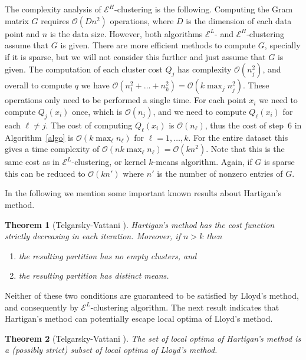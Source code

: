 \documentclass[aps,preprint,nofootinbib,floatfix]{revtex4-1}
\newtheorem{theorem}{Theorem}
\newcommand\OO{{\mathcal{O}}}
\begin{document}
The complexity analysis of $\mathcal{E}^H$-clustering is the following.
Computing the Gram matrix $G$ requires $\OO( D n^2)$ operations, where 
$D$ is the dimension of each data point and $n$ is the data size. However,
both algorithms $\mathcal{E}^L$- and $\mathcal{E}^H$-clustering 
assume that $G$ is given. There are more efficient
methods to compute $G$, specially if it is sparse, but we will not consider
this further and just assume that $G$ is given.
The computation of each cluster cost
$Q_j$ has complexity $\OO(n_j^2)$, and overall to compute $q$
we have $\OO(n_1^2+\dots + n_k^2) = \OO(k \max_j n_j^2)$. 
These operations only need to be performed a single time. For
each point $x_i$ we need to compute $Q_j(x_i)$ once, which is
$\OO(n_j)$, and we need to compute $Q_\ell(x_i)$ for each $\ell\ne j$. 
The cost of computing 
$Q_\ell(x_i)$
is $\OO(n_\ell)$, thus the cost of step~$6$ in
Algorithm~\ref{algo} is $\OO(k \max_\ell n_\ell)$ for $\ell=1,\dotsc,k$.
For the 
entire dataset this gives a time complexity
of $\OO(n k  \max_\ell n_\ell) =\OO(k n^2)$. Note that this is the same cost as
in $\mathcal{E}^L$-clustering, or kernel $k$-means algorithm. 
Again, if $G$ is sparse
this can be reduced to $\OO(k n')$ where $n'$ is the number of nonzero
entries of $G$.

In the following we mention some important known 
results about Hartigan's method.

\begin{theorem}[Telgarsky-Vattani \cite{Telgarsky}]
Hartigan's method has the cost function strictly decreasing in each
iteration. Moreover, if $n > k$ then 
\begin{enumerate}
\item \label{noempty} the resulting partition has no empty clusters, and
\item \label{diffmean} the resulting partition has distinct means.
\end{enumerate}
\end{theorem}

Neither of these two conditions are guaranteed to be 
satisfied  by Lloyd's method,
and consequently by $\mathcal{E}^L$-clustering 
algorithm.
The next result indicates that Hartigan's method can potentially 
escape local optima of Lloyd's method.

\begin{theorem}[Telgarsky-Vattani \cite{Telgarsky}]
The set of local optima of Hartigan's method is a (possibly strict) subset
of local optima of Lloyd's method.
\end{theorem}
\end{document}
